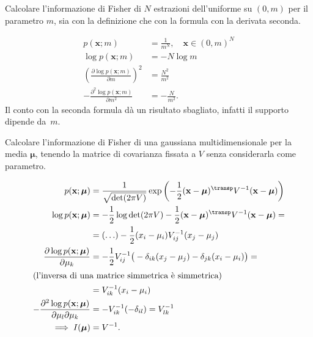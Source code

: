 \begin{exercise}
    
    Calcolare l'informazione di Fisher di $N$ estrazioni dell'uniforme su
    $(0,m)$ per il parametro $m$, sia con la definizione che con la formula
    con la derivata seconda.
    
\end{exercise}

\begin{solution}
	\begin{align*}
		p(\mathbf x;m)
		&= \frac1{m^N}, \quad \mathbf x\in(0,m)^N \\
		\log p(\mathbf x;m)
		&= -N\log m \\
		\left( \frac{\partial\log p(\mathbf x;m)}{\partial m} \right)^2
		&= \frac{N^2}{m^2} \\
		-\frac{\partial^2\log p(\mathbf x;m)}{\partial m^2}
		&= -\frac N{m^2}.
	\end{align*}
    Il conto con la seconda formula dà un risultato sbagliato, infatti il
    supporto dipende da~$m$.
\end{solution}

\begin{exercise}
    Calcolare l'informazione di Fisher di una gaussiana multidimensionale per
    la media $\boldsymbol\mu$, tenendo la matrice di covarianza fissata a $V$
    senza considerarla come parametro.
\end{exercise}

\begin{solution}
	\begin{align*}
		p(\mathbf x;\boldsymbol \mu)
		&= \frac1{\sqrt{\det(2\pi V)}}
		\exp \left( -\frac12 (\mathbf x-\boldsymbol\mu)^\transp V^{-1} (\mathbf x-\boldsymbol\mu) \right) \\
		\log p(\mathbf x;\boldsymbol\mu)
		&= -\frac12\log\det(2\pi V)
		- \frac12 (\mathbf x-\boldsymbol\mu)^\transp V^{-1} (\mathbf x-\boldsymbol\mu) = \\
		&= (\ldots) - \frac12 (x_i-\mu_i)V^{-1}_{ij}(x_j-\mu_j) \\
		\frac{\partial\log p(\mathbf x;\boldsymbol\mu)}{\partial\mu_k}
		&= -\frac12 V^{-1}_{ij} \big( -\delta_{ik}(x_j-\mu_j) - \delta_{jk}(x_i-\mu_i) \big) = \\
		\intertext{(l'inversa di una matrice simmetrica è simmetrica)}
		&= V^{-1}_{ik}(x_i-\mu_i) \\
		-\frac{\partial^2\log p(\mathbf x;\boldsymbol\mu)}{\partial\mu_l\partial\mu_k}
		&= -V^{-1}_{ik}(-\delta_{il}) = V^{-1}_{lk} \\
		\implies I(\boldsymbol\mu) &= V^{-1}.
	\end{align*}
\end{solution}

